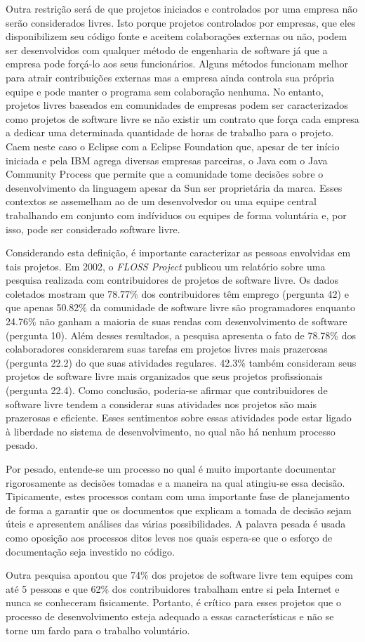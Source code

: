 Outra restrição será de que projetos iniciados e controlados por uma
empresa não serão considerados livres. Isto porque projetos
controlados por empresas, que eles disponibilizem seu código fonte e
aceitem colaborações externas ou não, podem ser desenvolvidos com
qualquer método de engenharia de software já que a empresa pode
forçá-lo aos seus funcionários. Alguns métodos funcionam melhor para
atrair contribuições externas mas a empresa ainda controla sua própria
equipe e pode manter o programa sem colaboração nenhuma. No entanto,
projetos livres baseados em comunidades de empresas podem ser
caracterizados como projetos de software livre se não existir um
contrato que força cada empresa a dedicar uma determinada quantidade
de horas de trabalho para o projeto. Caem neste caso o Eclipse com a
Eclipse Foundation que, apesar de ter início iniciada e pela IBM
agrega diversas empresas parceiras, o Java com o Java Community
Process que permite que a comunidade tome decisões sobre o
desenvolvimento da linguagem apesar da Sun ser proprietária da
marca. Esses contextos se assemelham ao de um desenvolvedor ou uma
equipe central trabalhando em conjunto com indíviduos ou equipes de
forma voluntária e, por isso, pode ser considerado software livre.

Considerando esta definição, é importante caracterizar as pessoas
envolvidas em tais projetos. Em 2002, o \emph{FLOSS Project}
\cite{FlossProject} publicou um relatório sobre uma pesquisa realizada
com contribuidores de projetos de software livre. Os dados coletados
\cite{FlossStats} mostram que 78.77\% dos contribuidores têm emprego
(pergunta 42) e que apenas 50.82\% da comunidade de software livre são
programadores enquanto 24.76\% não ganham a maioria de suas rendas com
desenvolvimento de software (pergunta 10). Além desses resultados, a
pesquisa apresenta o fato de 78.78\% dos colaboradores considerarem
suas tarefas em projetos livres mais prazerosas (pergunta 22.2) do que
suas atividades regulares. 42.3\% também consideram seus projetos de
software livre mais organizados que seus projetos profissionais
(pergunta 22.4). Como conclusão, poderia-se afirmar que contribuidores
de software livre tendem a considerar suas atividades nos projetos são
mais prazerosas e eficiente. Esses sentimentos sobre essas atividades
pode estar ligado à liberdade no sistema de desenvolvimento, no qual
não há nenhum processo pesado.

Por pesado, entende-se um processo no qual é muito importante
documentar rigorosamente as decisões tomadas e a maneira na qual
atingiu-se essa decisão. Tipicamente, estes processos contam com uma
importante fase de planejamento de forma a garantir que os documentos
que explicam a tomada de decisão sejam úteis e apresentem análises das
várias possibilidades. A palavra pesada é usada como oposição aos
processos ditos leves nos quais espera-se que o esforço de
documentação seja investido no código. %

Outra pesquisa \cite{Reis2003} apontou que 74\% dos projetos de
software livre tem equipes com até 5 pessoas e que 62\% dos
contribuidores trabalham entre si pela Internet e nunca se conheceram
fisicamente. Portanto, é crítico para esses projetos que o processo de
desenvolvimento esteja adequado a essas características e não se torne
um fardo para o trabalho voluntário.
